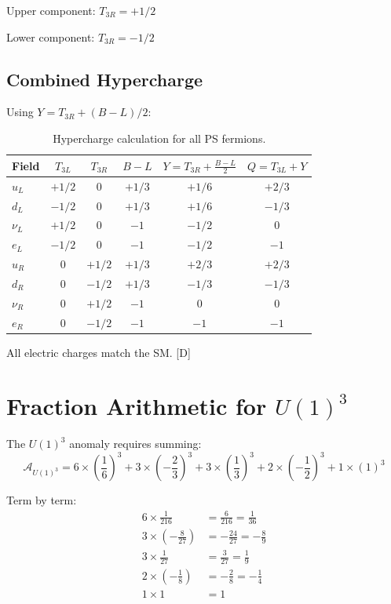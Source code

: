 \documentclass[11pt,a4paper]{article}
\newcommand{\tagD}{\textcolor{blue!70!black}{[D]}}
\begin{document}
Upper component: $T_{3R} = +1/2$

Lower component: $T_{3R} = -1/2$

\subsection{Combined Hypercharge}

Using $Y = T_{3R} + (B-L)/2$:

\begin{table}[h]
\centering
\caption{Hypercharge calculation for all PS fermions.}
\label{tab:Y-calc}
\begin{tabular}{lccccc}
\toprule
Field & $T_{3L}$ & $T_{3R}$ & $B-L$ & $Y = T_{3R} + \frac{B-L}{2}$ & $Q = T_{3L} + Y$ \\
\midrule
$u_L$ & $+1/2$ & 0 & $+1/3$ & $+1/6$ & $+2/3$ \\
$d_L$ & $-1/2$ & 0 & $+1/3$ & $+1/6$ & $-1/3$ \\
$\nu_L$ & $+1/2$ & 0 & $-1$ & $-1/2$ & $0$ \\
$e_L$ & $-1/2$ & 0 & $-1$ & $-1/2$ & $-1$ \\
\midrule
$u_R$ & 0 & $+1/2$ & $+1/3$ & $+2/3$ & $+2/3$ \\
$d_R$ & 0 & $-1/2$ & $+1/3$ & $-1/3$ & $-1/3$ \\
$\nu_R$ & 0 & $+1/2$ & $-1$ & $0$ & $0$ \\
$e_R$ & 0 & $-1/2$ & $-1$ & $-1$ & $-1$ \\
\bottomrule
\end{tabular}
\end{table}

All electric charges match the SM. \tagD

\section{Fraction Arithmetic for $U(1)^3$}
\label{app:fractions}

The $U(1)^3$ anomaly requires summing:
\begin{equation}
\label{eq:u1-3-raw}
\mathcal{A}_{U(1)^3} = 6 \times \left(\frac{1}{6}\right)^3 + 3 \times \left(-\frac{2}{3}\right)^3 + 3 \times \left(\frac{1}{3}\right)^3 + 2 \times \left(-\frac{1}{2}\right)^3 + 1 \times (1)^3
\end{equation}

Term by term:
\begin{align}
\label{eq:u1-3-term1}
6 \times \frac{1}{216} &= \frac{6}{216} = \frac{1}{36} \\
\label{eq:u1-3-term2}
3 \times \left(-\frac{8}{27}\right) &= -\frac{24}{27} = -\frac{8}{9} \\
\label{eq:u1-3-term3}
3 \times \frac{1}{27} &= \frac{3}{27} = \frac{1}{9} \\
\label{eq:u1-3-term4}
2 \times \left(-\frac{1}{8}\right) &= -\frac{2}{8} = -\frac{1}{4} \\
\label{eq:u1-3-term5}
1 \times 1 &= 1
\end{align}
\end{document}
